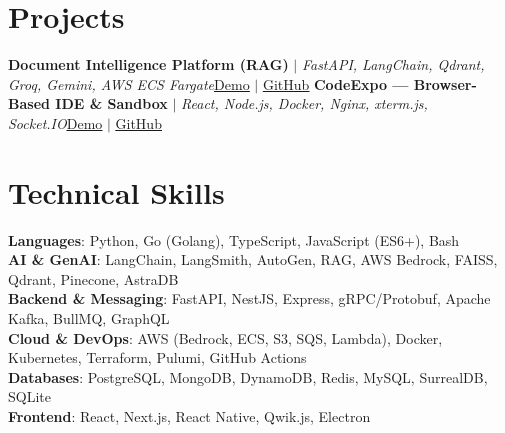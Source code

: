 \documentclass[letterpaper,10pt]{article}
\begin{document}
\section{Projects}
    \resumeSubHeadingListStart
      \resumeProjectHeading
          {\textbf{Document Intelligence Platform (RAG)} $|$ \emph{FastAPI, LangChain, Qdrant, Groq, Gemini, AWS ECS Fargate}}{\href{https://harshsaw.me}{\underline{Demo}} $|$ \href{https://github.com/harshsaw}{\underline{GitHub}}}
          \resumeItemListStart
          \resumeItemListEnd
      \resumeProjectHeading
          {\textbf{CodeExpo --- Browser-Based IDE \& Sandbox} $|$ \emph{React, Node.js, Docker, Nginx, xterm.js, Socket.IO}}{\href{https://harshsaw.me}{\underline{Demo}} $|$ \href{https://github.com/harshsaw}{\underline{GitHub}}}
          \resumeItemListStart
          \resumeItemListEnd
    \resumeSubHeadingListEnd

\section{Technical Skills}
 \begin{itemize}[leftmargin=0.15in, label={}]
    \small{\item{
     \textbf{Languages}{: Python, Go (Golang), TypeScript, JavaScript (ES6+), Bash} \\
     \textbf{AI \& GenAI}{: LangChain, LangSmith, AutoGen, RAG, AWS Bedrock, FAISS, Qdrant, Pinecone, AstraDB} \\
     \textbf{Backend \& Messaging}{: FastAPI, NestJS, Express, gRPC/Protobuf, Apache Kafka, BullMQ, GraphQL} \\
     \textbf{Cloud \& DevOps}{: AWS (Bedrock, ECS, S3, SQS, Lambda), Docker, Kubernetes, Terraform, Pulumi, GitHub Actions} \\
     \textbf{Databases}{: PostgreSQL, MongoDB, DynamoDB, Redis, MySQL, SurrealDB, SQLite} \\
     \textbf{Frontend}{: React, Next.js, React Native, Qwik.js, Electron}
    }}
 \end{itemize}
\end{document}
